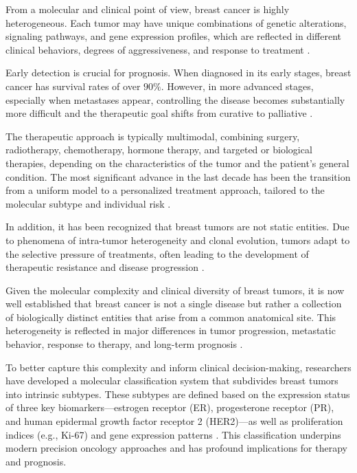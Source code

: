 From a molecular and clinical point of view, breast cancer is highly
heterogeneous. Each tumor may have unique combinations of genetic alterations,
signaling pathways, and gene expression profiles, which are reflected in
different clinical behaviors, degrees of aggressiveness, and response to
treatment
\textcite{origins_and_evolution_bca_Polyak2007,diff_bca_usa_Howlader2018}.

Early detection is crucial for prognosis. When diagnosed in its early stages,
breast cancer has survival rates of over $90\%$. However, in more advanced
stages, especially when metastases appear, controlling the disease becomes
substantially more difficult and the therapeutic goal shifts from curative to
palliative
\textcite{updatedbca_Hong2022Breast,clinical_implication_bca_Adamo2015}.

The therapeutic approach is typically multimodal, combining surgery,
radiotherapy, chemotherapy, hormone therapy, and targeted or biological
therapies, depending on the characteristics of the tumor and the patient's
general condition. The most significant advance in the last decade has been the
transition from a uniform model to a personalized treatment approach, tailored
to the molecular subtype and individual risk
\textcite{BreastEpidemiology_Romanowicz2022}.

In addition, it has been recognized that breast tumors are not static entities.
Due to phenomena of intra-tumor heterogeneity and clonal evolution, tumors
adapt to the selective pressure of treatments, often leading to the development
of therapeutic resistance and disease progression
\textcite{origins_and_evolution_bca_Polyak2007}.

Given the molecular complexity and clinical diversity of breast tumors, it is
now well established that breast cancer is not a single disease but rather a
collection of biologically distinct entities that arise from a common
anatomical site. This heterogeneity is reflected in major differences in tumor
progression, metastatic behavior, response to therapy, and long-term prognosis
\textcite{clinical_implication_bca_Adamo2015,bc_subtypes_Prat2015Clinical}.

To better capture this complexity and inform clinical decision-making,
researchers have developed a molecular classification system that subdivides
breast tumors into intrinsic subtypes. These subtypes are defined based on the
expression status of three key biomarkers—estrogen receptor (ER), progesterone
receptor (PR), and human epidermal growth factor receptor 2 (HER2)—as well as
proliferation indices (e.g., Ki-67) and gene expression patterns
\textcite{bc_molecular_Perou2000,bc_subtypes_Prat2015Clinical}. This
classification underpins modern precision oncology approaches and has profound
implications for therapy and prognosis.

